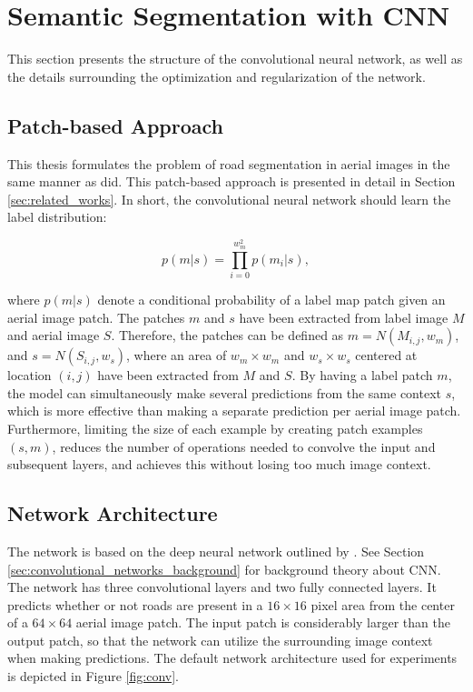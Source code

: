 \section{Semantic Segmentation with CNN}
\label{sec:network}
This section presents the structure of the convolutional neural network, as well as the details surrounding the optimization and regularization of the network. 

\subsection{Patch-based Approach}
This thesis formulates the problem of road segmentation in aerial images in the same manner as \cite{Mnih_roads_high_res_aerial_images} did. This patch-based approach is presented in detail in Section \ref{sec:related_works}. In short, the convolutional neural network should learn the label distribution:

$$ p(m|s) = \prod_{i=0}^{w_m^2}p(m_i | s),  $$

\noindent where $p(m|s)$ denote a conditional probability of a label map patch given an aerial image patch. The patches $m$ and $s$ have been extracted from label image $M$ and aerial image $S$. Therefore, the patches can be defined as $m =N(M_{i,j}, w_m)$, and $ s = N(S_{i,j}, w_s)$, where an area of $w_m \times w_m$ and $w_s \times w_s$ centered at location $(i, j)$ have been extracted from $M$ and $S$. By having a label patch $m$, the model can simultaneously make several predictions from the same context $s$, which is more effective than making a separate prediction per aerial image patch. Furthermore, limiting the size of each example by creating patch examples $(s, m)$, reduces the number of operations needed to convolve the input and subsequent layers, and achieves this without losing too much image context. \\ 


\subsection{Network Architecture}
The network is based on the deep neural network outlined by \cite{MnihThesis}. See Section \ref{sec:convolutional_networks_background} for background theory about \ac{CNN}. The network has three convolutional layers and two fully connected layers. It predicts whether or not roads are present in a $16 \times 16$ pixel area from the center of  a $64 \times 64$ aerial image patch. The input patch is considerably larger than the output patch, so that the network can utilize the surrounding image context when making predictions. The default network architecture used for experiments is depicted in Figure \ref{fig:conv}. \\

